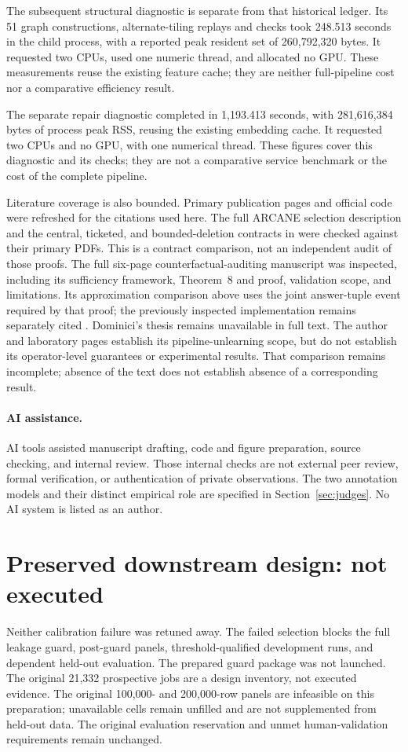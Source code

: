 The subsequent structural diagnostic is separate from that historical ledger.
Its 51 graph constructions, alternate-tiling replays and checks took 248.513
seconds in the child process, with a reported peak resident set of
260,792,320 bytes. It requested two CPUs, used one numeric thread, and
allocated no GPU. These measurements reuse the existing feature cache;
they are neither full-pipeline cost nor a comparative efficiency result.

The separate repair diagnostic completed in 1,193.413 seconds, with
281,616,384 bytes of process peak RSS, reusing the existing embedding
cache. It requested two CPUs and no GPU, with one numerical thread.
These figures cover this diagnostic and its checks; they are not a
comparative service benchmark or the cost of the complete pipeline.

Literature coverage is also bounded. Primary publication pages and
official code were refreshed for the citations used here. The full
ARCANE selection description and the central, ticketed, and bounded-deletion
contracts in \citep{ticketed,space} were checked against their primary PDFs.
This is a contract comparison, not an independent audit of those proofs. The full six-page counterfactual-auditing manuscript \citep{counterfactual}
was inspected, including its sufficiency framework, Theorem~8 and proof,
validation scope, and limitations. Its approximation comparison above uses
the joint answer-tuple event required by that proof; the previously inspected
implementation remains separately cited \citep{counterfactualcode}.
Dominici's thesis \citep{dominici} remains unavailable in full text. The author
and laboratory pages establish its pipeline-unlearning scope, but do not
establish its operator-level guarantees or experimental results. That
comparison remains incomplete; absence of the text does not establish
absence of a corresponding result.
\paragraph{AI assistance.}
AI tools assisted manuscript drafting, code and figure preparation, source
checking, and internal review. Those internal checks are not external peer review, formal
verification, or authentication of private observations. The two annotation
models and their distinct empirical role are specified in
Section~\ref{sec:judges}. No AI system is listed as an author.

\section{Preserved downstream design: not executed}\label{sec:design}
Neither calibration failure was retuned away. The failed selection blocks
the full leakage guard, post-guard panels, threshold-qualified development
runs, and dependent held-out evaluation. The prepared guard package was
not launched. The original 21,332 prospective jobs are a design inventory,
not executed evidence. The original 100,000- and 200,000-row panels are
infeasible on this preparation; unavailable cells remain unfilled and are
not supplemented from held-out data. The original evaluation reservation
and unmet human-validation requirements remain unchanged.

